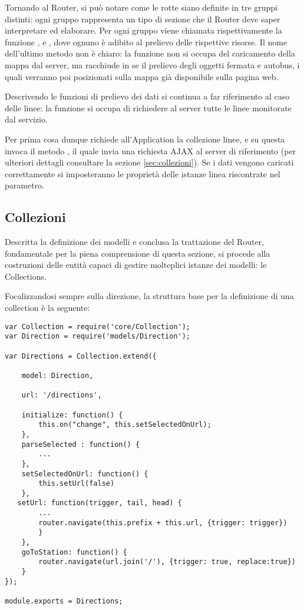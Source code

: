 \vspace{1cm}

Tornando al Router, si può notare come le rotte siano definite in tre gruppi distinti: ogni gruppo rappresenta un tipo di sezione che il Router deve saper interpretare ed elaborare. Per ogni gruppo viene chiamata rispettivamente la funzione ,  e , dove ognuno è adibito al prelievo delle rispettive risorse. Il nome dell'ultimo metodo non è chiaro: la funzione non si occupa del caricamento della mappa dal server, ma racchiude in se il prelievo degli oggetti fermata e autobus, i quali verranno poi posizionati sulla mappa già disponibile sulla pagina web.

Descrivendo le funzioni di prelievo dei dati si continua a far riferimento al caso delle linee: la funzione  si occupa di richiedere al server tutte le linee monitorate dal servizio.

Per prima cosa dunque richiede all'Application la collezione linee, e su questa invoca il metodo , il quale invia una richiesta AJAX al server di riferimento (per ulteriori dettagli consultare la sezione \ref{sec:collezioni}). Se i dati vengono caricati correttamente si imposteranno le proprietà  delle istanze linea riscontrate nel parametro.

\subsection{Collezioni} %
\label{sub:collezioni}

Descritta la definizione dei modelli e conclusa la trattazione del Router, fondamentale per la piena comprensione di questa sezione, si procede alla costruzioni delle entità capaci di gestire molteplici istanze dei modelli: le Collections.

Focalizzandosi sempre sulla direzione, la struttura base per la definizione di una collection è la seguente:

\begin{lstlisting}
var Collection = require('core/Collection');
var Direction = require('models/Direction');

var Directions = Collection.extend({
    
    model: Direction,
    
    url: '/directions',
    
    initialize: function() {
        this.on("change", this.setSelectedOnUrl);
    },
    parseSelected : function() {
        ...
    },    
    setSelectedOnUrl: function() {
        this.setUrl(false)
    },
   setUrl: function(trigger, tail, head) {
        ...
        router.navigate(this.prefix + this.url, {trigger: trigger})
        }   
    },
    goToStation: function() {
        router.navigate(url.join('/'), {trigger: true, replace:true})
    }
});

module.exports = Directions;
\end{lstlisting}

